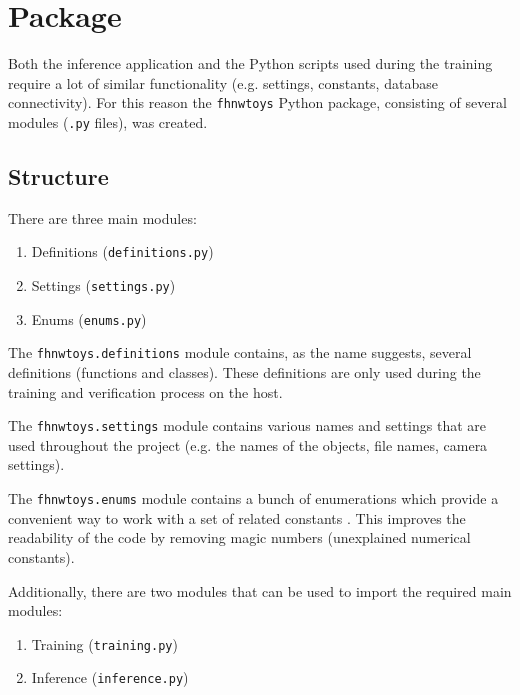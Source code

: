\section{Package}
\label{sec:inference:package}

Both the inference application and the Python scripts used during the training require a lot of similar functionality (e.g. settings, constants, database connectivity).
For this reason the \texttt{fhnwtoys} Python package, consisting of several modules (\texttt{.py} files), was created.

\subsection{Structure}
\label{subsec:inference:package:structure}
There are three main modules:
\begin{enumerate}
  \item Definitions (\texttt{definitions.py})
  \item Settings (\texttt{settings.py})
  \item Enums (\texttt{enums.py})
\end{enumerate}

The \texttt{fhnwtoys.definitions} module contains, as the name suggests, several definitions (functions and classes).
These definitions are only used during the training and verification process on the host.

The \texttt{fhnwtoys.settings} module contains various names and settings that are used throughout the project (e.g. the names of the objects, file names, camera settings).

The \texttt{fhnwtoys.enums} module contains a bunch of enumerations which provide a convenient way to work with a set of related constants \cite{}. %
This improves the readability of the code by removing magic numbers (unexplained numerical constants).

Additionally, there are two modules that can be used to import the required main modules:
\begin{enumerate}
  \item Training (\texttt{training.py})
  \item Inference (\texttt{inference.py})
\end{enumerate}

